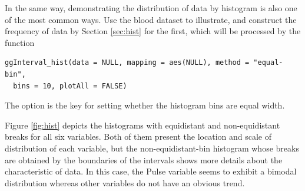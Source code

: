 \documentclass[article]{jss}
\begin{document}
In the same way, demonstrating the distribution of data by histogram is also one of the most common ways. Use the blood dataset to illustrate, and construct the frequency of data by Section \ref{sec:hist} for the first, which will be processed by the function

\begin{verbatim}
ggInterval_hist(data = NULL, mapping = aes(NULL), method = "equal-bin",
  bins = 10, plotAll = FALSE)
\end{verbatim}

The option  is the key for setting whether the histogram bins are equal width. 

Figure \ref{fig:hist} depicts the histograms with equidistant and non-equidistant breaks for all six variables. Both of them present the location and scale of distribution of each variable, but the non-equidistant-bin histogram whose breaks are obtained by the boundaries of the intervals shows more details about the characteristic of data. In this case, the Pulse variable seems to exhibit a bimodal distribution whereas other variables do not have an obvious trend.
\end{document}
